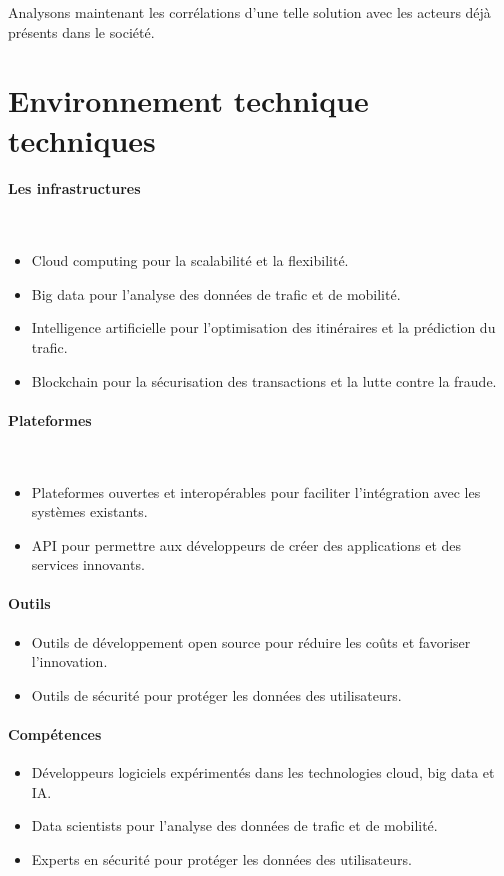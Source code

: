 \documentclass{article}
\begin{document}
Analysons maintenant les corrélations d'une telle solution avec les acteurs déjà présents dans le société.


\section{Environnement technique techniques}

\paragraph{\textbf{Les infrastructures}}\\
\begin{itemize}
    \item Cloud computing pour la scalabilité et la flexibilité.
    \item Big data pour l'analyse des données de trafic et de mobilité.
    \item Intelligence artificielle pour l'optimisation des itinéraires et la prédiction du trafic.
    \item Blockchain pour la sécurisation des transactions et la lutte contre la fraude.
\end{itemize}
\paragraph{\textbf{Plateformes}}\\
\begin{itemize}
    \item Plateformes ouvertes et interopérables pour faciliter l'intégration avec les systèmes existants.
    \item API pour permettre aux développeurs de créer des applications et des services innovants.
\end{itemize}
\paragraph{\textbf{Outils}}
\begin{itemize}
    \item Outils de développement open source pour réduire les coûts et favoriser l'innovation.
    \item Outils de sécurité pour protéger les données des utilisateurs.
\end{itemize}
\paragraph{\textbf{Compétences}}
\begin{itemize}
    \item Développeurs logiciels expérimentés dans les technologies cloud, big data et IA.
    \item Data scientists pour l'analyse des données de trafic et de mobilité.
    \item Experts en sécurité pour protéger les données des utilisateurs.
\end{itemize}
\end{document}
